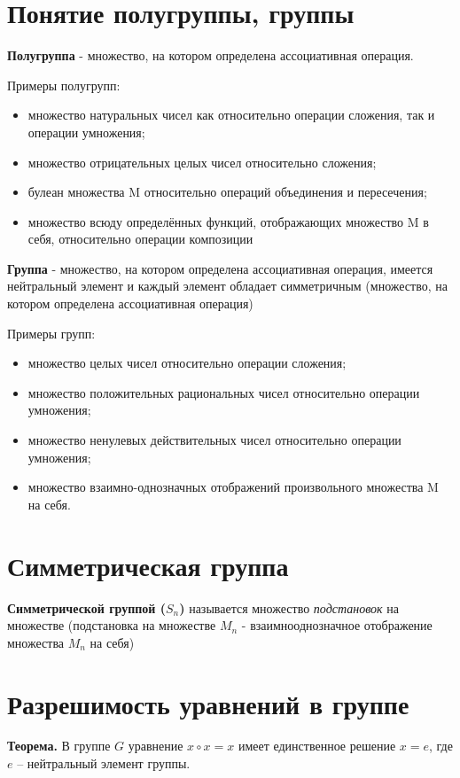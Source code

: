 \documentclass[a4paper]{article}
\begin{document}
{\begin{small}
\section*{Понятие полугруппы, группы}
\textbf{Полугруппа} - множество, на котором определена ассоциативная операция.

Примеры полугрупп:
\begin{itemize}
\item множество натуральных чисел как относительно операции сложения, так и
операции умножения;
\item множество отрицательных целых чисел относительно сложения;
\item булеан множества M относительно операций объединения и пересечения;
\item множество всюду определённых функций, отображающих множество M в
себя, относительно операции композиции
\end{itemize}

\textbf{Группа} - множество, на котором определена ассоциативная операция, имеется нейтральный элемент и каждый элемент обладает симметричным (множество, на котором определена ассоциативная операция)

Примеры групп:
\begin{itemize}
\item множество целых чисел относительно операции сложения;
\item множество положительных рациональных чисел относительно операции
умножения;
\item множество ненулевых действительных чисел относительно операции
умножения;
\item множество взаимно-однозначных отображений произвольного множества M на себя.
\end{itemize}

\section*{Симметрическая группа}
\textbf{Симметрической группой ($S_n$)} называется множество \textit{подстановок} на множестве (подстановка на множестве $M_n$ - взаимнооднозначное отображение множества $M_n$ на себя)

\section*{Разрешимость уравнений в группе
}

\textbf{Теорема.}  В группе  $G$ уравнение $x \circ x = x$ имеет
единственное решение $x = e$, где $e$ – нейтральный элемент группы.


\end{small}}
\end{document}
